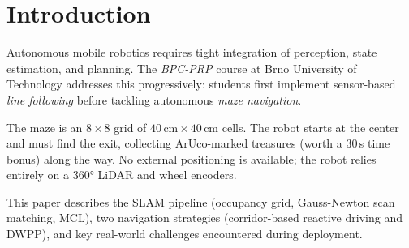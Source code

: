 \section{Introduction}

Autonomous mobile robotics requires tight integration of perception, state estimation, and
planning. The \textit{BPC-PRP} course at Brno University of Technology addresses this
progressively: students first implement sensor-based \textit{line following} before tackling
autonomous \textit{maze navigation}.

The maze is an $8{\times}8$ grid of $40\,\text{cm}{\times}40\,\text{cm}$ cells. The robot
starts at the center and must find the exit, collecting ArUco-marked treasures (worth a 30\,s
time bonus) along the way. No external positioning is available; the robot relies entirely on a
360° LiDAR and wheel encoders.

This paper describes the SLAM pipeline (occupancy grid, Gauss-Newton scan matching, MCL), two
navigation strategies (corridor-based reactive driving and DWPP), and key real-world challenges
encountered during deployment.
